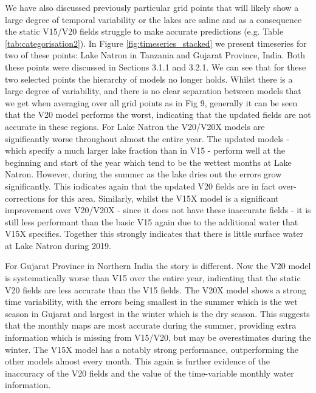 \documentclass[hess, twostagejnl]{copernicus}
\begin{document}
We have also discussed previously particular grid points that will likely show a large degree of temporal variability or the lakes are saline and as a consequence the static V15/V20 fields struggle to make accurate predictions (e.g. Table \ref{tab:categorisation2}). In Figure \ref{fig:timeseries_stacked} we present timeseries for two of these points: Lake Natron in Tanzania and Gujarat Province, India. Both these points were discussed in Sections 3.1.1 and 3.2.1. We can see that for these two selected points the hierarchy of models no longer holds. Whilst there is a large degree of variability, and there is no clear separation between models that we get when averaging over all grid points as in Fig 9, generally it can be seen that the V20 model performs the worst, indicating that the updated fields are not accurate in these regions. For Lake Natron the V20/V20X models are significantly worse throughout almost the entire year. The updated models - which specify a much larger lake fraction than in V15 - perform well at the beginning and start of the year which tend to be the wettest months at Lake Natron. However, during the summer as the lake dries out the errors grow significantly. This indicates again that the updated V20 fields are in fact over-corrections for this area. Similarly, whilst the V15X model is a significant improvement over V20/V20X - since it does not have these inaccurate fields - it is still less performant than the basic V15 again due to the additional water that V15X specifies. Together this strongly indicates that there is little surface water at Lake Natron during 2019. \newline 

\noindent For Gujarat Province in Northern India the story is different. Now the V20 model is systematically worse than V15 over the entire year, indicating that the static V20 fields are less accurate than the V15 fields. The V20X model shows a strong time variability, with the errors being smallest in the summer which is the wet season in Gujarat and largest in the winter which is the dry season. This suggests that the monthly maps are most accurate during the summer, providing extra information which is missing from V15/V20, but may be overestimates during the winter. The V15X model has a notably strong performance, outperforming the other models almost every month. This again is further evidence of the inaccuracy of the V20 fields and the value of the time-variable monthly water information.
\end{document}
